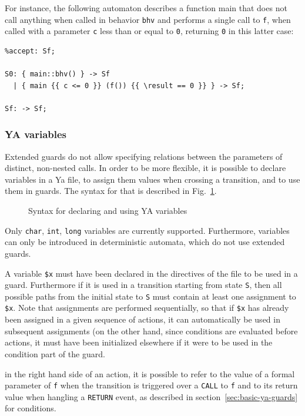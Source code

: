 \documentclass{frama-c-book}
\begin{document}
For instance, the following automaton describes a function main that does not
call anything when called in behavior \lstinline|bhv| and performs a single call
to \lstinline|f|, when called with a parameter \lstinline|c| less than or
equal to \lstinline|0|, returning \lstinline|0| in this latter case:
\begin{lstlisting}[language=ya]
%init: S0;
%accept: Sf;

S0: { main::bhv() } -> Sf
  | { main {{ c <= 0 }} (f()) {{ \result == 0 }} } -> Sf;

Sf: -> Sf;
\end{lstlisting}

\subsubsection{YA variables}
Extended guards do not allow specifying relations between the parameters of
distinct, non-nested calls. In order to be more flexible, it is possible to declare
variables in a Ya file, to assign them values when crossing a transition, and to use
them in guards. The syntax for that is described in Fig.~\ref{fig:ya-variables}.
\begin{figure}[htb]

\caption{Syntax for declaring and using YA variables}
\label{fig:ya-variables}
\end{figure}

Only \lstinline|char|, \lstinline|int|, \lstinline|long| variables are currently
supported. Furthermore, variables can only be introduced in deterministic automata,
which do not use extended guards.

A variable \lstinline|$x| %
must have been declared in the directives of the file to be used in a guard. Furthermore
if it is used in a transition starting from state \lstinline|S|, then all possible paths
from the initial state to \lstinline|S| must contain at least one assignment to \lstinline|$x|.
Note that assignments are performed sequentially, so that if
\lstinline|$x| has already been assigned in a given sequence of actions, it can automatically
be used in subsequent assignments (on the other hand, since conditions are evaluated
before actions, it must have been initialized elsewhere if it were to be used in the
condition part of the guard.

in the right hand side of an action, it is possible to refer to the value of a formal
parameter of \lstinline|f| when the transition is triggered over a \lstinline|CALL|
to \lstinline|f| and to its return value when hangling a \lstinline|RETURN| event,
as described in section~\ref{sec:basic-ya-guards} for conditions.
\end{document}

